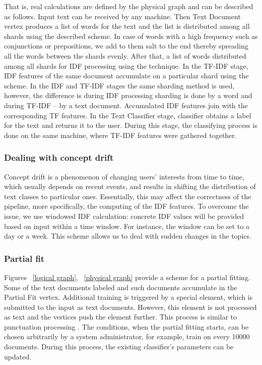 That is, real calculations are defined by the physical graph and can be described as follows. Input text can be received by any machine. Then Text Document vertex produces a list of words for the text and the list is distributed among all shards using the described scheme. In case of words with a high frequency such as conjunctions or prepositions, we add to them salt to the end thereby spreading all the words between the shards evenly. After that, a list of words distributed among all shards for IDF processing using the technique. In the TF-IDF stage, IDF features of the same document accumulate on a particular shard using the scheme. In the IDF and TF-IDF stages the same sharding method is used, however, the difference is during IDF processing sharding is done by a word and during TF-IDF -- by a text document. Accumulated IDF features join with the corresponding TF features. In the Text Classifier stage, classifier obtains a label for the text and returns it to the user. During this stage, the classifying process is done on the same machine, where TF-IDF features were gathered together.

\subsubsection{Dealing with concept drift}

Concept drift is a phenomenon of changing users' interests from time to time, which usually depends on recent events, and results in shifting the distribution of text classes to particular ones. Essentially, this may affect the correctness of the pipeline, more specifically, the computing of the IDF features. To overcome the issue, we use windowed IDF calculation: concrete IDF values will be provided based on input within a time window. For instance, the window can be set to a day or a week. This scheme allows us to deal with sudden changes in the topics.

\subsubsection{Partial fit}

Figures ~\ref{logical graph}, ~\ref{physical graph} provide a scheme for a partial fitting. Some of the text documents labeled and such documents accumulate in the Partial Fit vertex. Additional training is triggered by a special element, which is submitted to the input as text documents. However, this element is not processed as text and the vertices push the element further. This process is similar to punctuation processing \cite{tucker2003exploiting}. The conditions, when the partial fitting starts, can be chosen arbitrarily by a system administrator, for example, train on every 10000 documents. During this process, the existing classifier's parameters can be updated.

